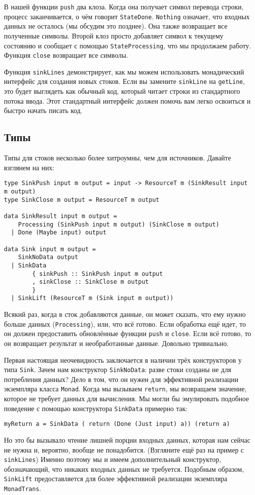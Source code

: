 В нашей функции \lstinline=push= два клоза. Когда она получает символ перевода строки,
процесс заканчивается, о чём говорит \lstinline=StateDone=. \lstinline=Nothing= означает,
что
входных данных не
осталось (мы обсудим это позднее). Она также возвращает все полученные символы. Второй
клоз просто добавляет символ к текущему состоянию и сообщает с помощью
\lstinline=StateProcessing=, что мы продолжаем работу.
Функция \lstinline=close= возвращает все символы.

Функция \lstinline=sinkLines= демонстрирует, как мы можем использовать монадический
интерфейс для создания новых стоков. Если вы замените \lstinline=sinkLine= на
\lstinline=getLine=, это будет выглядеть
как обычный код, который читает строки из стандартного потока ввода. Этот
стандартный интерфейс должен помочь вам легко освоиться и быстро начать писать код.

\subsection{Типы}

Типы для стоков несколько более хитроумны, чем для источников. Давайте взглянем на них:
\begin{lstlisting}
type SinkPush input m output = input -> ResourceT m (SinkResult input m output)
type SinkClose m output = ResourceT m output

data SinkResult input m output =
    Processing (SinkPush input m output) (SinkClose m output)
  | Done (Maybe input) output

data Sink input m output =
    SinkNoData output
  | SinkData
        { sinkPush :: SinkPush input m output
        , sinkClose :: SinkClose m output
        }
  | SinkLift (ResourceT m (Sink input m output))
\end{lstlisting}
Всякий раз, когда в сток добавляются данные, он может сказать, что ему нужно больше
данных (\lstinline{Processing}), или, что всё готово. Если обработка ещё идет, то он должен предоставить
обновлённые функции \lstinline{push} и \lstinline{close}. Если всё готово, то он возвращает результат и
необработанные данные. Довольно тривиально.

Первая настоящая неочевидность заключается в наличии трёх конструкторов у
типа \lstinline=Sink=. Зачем нам конструктор \lstinline=SinkNoData=: разве стоки
созданы не для потребления данных? Дело в том, что он нужен для эффективной реализации
экземпляра класса \lstinline=Monad=. Когда мы вызываем \lstinline=return=, мы
возвращаем значение, которое не требует данных для вычисления. Мы могли бы эмулировать
подобное поведение с помощью конструктора \lstinline=SinkData= примерно так:
\begin{lstlisting}
myReturn a = SinkData ( return (Done (Just input) a)) (return a)
\end{lstlisting}
Но это бы вызывало чтение лишней порции входных данных, которая нам сейчас не нужна и,
вероятно, вообще не понадобится. (Взгляните ещё раз на пример с \lstinline=sinkLines=)
Именно поэтому мы и имеем дополнительный конструктор, обозначающий, что никаких входных данных не требуется.
Подобным образом, \lstinline=SinkLift= предоставляется для более эффективной реализации
экземпляра \lstinline=MonadTrans=.

